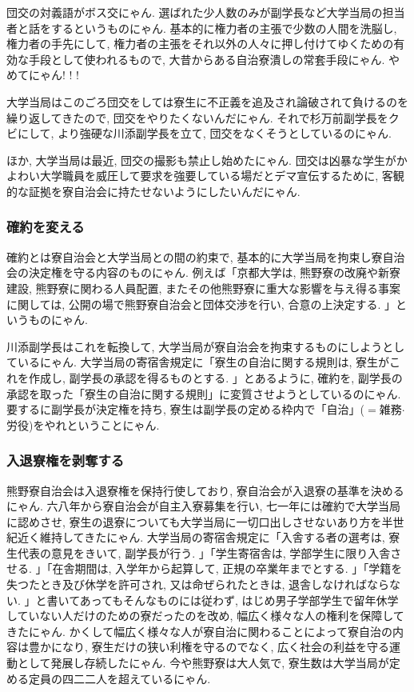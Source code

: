 \documentclass[10pt,b5jsbook,dvips,dvipdfmx,openany]{jsbook}
\theoremstyle{definition}
\begin{document}
			団交の対義語がボス交にゃん. 選ばれた少人数のみが副学長など大学当局の担当者と話をするというものにゃん. 基本的に権力者の主張で少数の人間を洗脳し, 権力者の手先にして, 権力者の主張をそれ以外の人々に押し付けてゆくための有効な手段として使われるもので, 大昔からある自治寮潰しの常套手段にゃん. やめてにゃん! ! !

			大学当局はこのごろ団交をしては寮生に不正義を追及され論破されて負けるのを繰り返してきたので, 団交をやりたくないんだにゃん. それで杉万前副学長をクビにして, より強硬な川添副学長を立て, 団交をなくそうとしているのにゃん.

			ほか, 大学当局は最近, 団交の撮影も禁止し始めたにゃん. 団交は凶暴な学生がかよわい大学職員を威圧して要求を強要している場だとデマ宣伝するために, 客観的な証拠を寮自治会に持たせないようにしたいんだにゃん.

			\subsubsection{確約を変える}
			確約とは寮自治会と大学当局との間の約束で, 基本的に大学当局を拘束し寮自治会の決定権を守る内容のものにゃん. 例えば「京都大学は, 熊野寮の改廃や新寮建設, 熊野寮に関わる人員配置, またその他熊野寮に重大な影響を与え得る事案に関しては, 公開の場で熊野寮自治会と団体交渉を行い, 合意の上決定する. 」というものにゃん.

			川添副学長はこれを転換して, 大学当局が寮自治会を拘束するものにしようとしているにゃん. 大学当局の寄宿舎規定に「寮生の自治に関する規則は, 寮生がこれを作成し, 副学長の承認を得るものとする. 」とあるように, 確約を, 副学長の承認を取った「寮生の自治に関する規則」に変質させようとしているのにゃん. 要するに副学長が決定権を持ち, 寮生は副学長の定める枠内で「自治」($=$雑務$ \cdot $ 労役)をやれということにゃん.

			\subsubsection{入退寮権を剥奪する}
			熊野寮自治会は入退寮権を保持行使しており, 寮自治会が入退寮の基準を決めるにゃん. 六八年から寮自治会が自主入寮募集を行い, 七一年には確約で大学当局に認めさせ, 寮生の退寮についても大学当局に一切口出しさせないあり方を半世紀近く維持してきたにゃん. 大学当局の寄宿舎規定に「入舎する者の選考は, 寮生代表の意見をきいて, 副学長が行う. 」「学生寄宿舎は, 学部学生に限り入舎させる. 」「在舎期間は, 入学年から起算して, 正規の卒業年までとする. 」「学籍を失つたとき及び休学を許可され, 又は命ぜられたときは, 退舎しなければならない. 」と書いてあってもそんなものには従わず, はじめ男子学部学生で留年休学していない人だけのための寮だったのを改め, 幅広く様々な人の権利を保障してきたにゃん. かくして幅広く様々な人が寮自治に関わることによって寮自治の内容は豊かになり, 寮生だけの狭い利権を守るのでなく, 広く社会の利益を守る運動として発展し存続したにゃん. 今や熊野寮は大人気で, 寮生数は大学当局が定める定員の四二二人を超えているにゃん.
\end{document}
